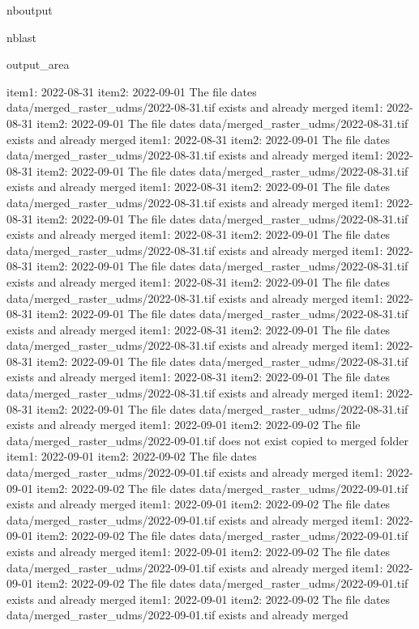 \documentclass[letterpaper,10pt]{sphinxmanual}
\begin{document}
\begin{sphinxuseclass}{nboutput}
\begin{sphinxuseclass}{nblast}
{\begin{sphinxuseclass}{output_area}
\begin{sphinxuseclass}{}
\begin{sphinxVerbatim}[commandchars=\\\{\}]
item1:  2022-08-31
item2:  2022-09-01
The file dates data/merged\_raster\_udms/2022-08-31.tif exists and already merged
item1:  2022-08-31
item2:  2022-09-01
The file dates data/merged\_raster\_udms/2022-08-31.tif exists and already merged
item1:  2022-08-31
item2:  2022-09-01
The file dates data/merged\_raster\_udms/2022-08-31.tif exists and already merged
item1:  2022-08-31
item2:  2022-09-01
The file dates data/merged\_raster\_udms/2022-08-31.tif exists and already merged
item1:  2022-08-31
item2:  2022-09-01
The file dates data/merged\_raster\_udms/2022-08-31.tif exists and already merged
item1:  2022-08-31
item2:  2022-09-01
The file dates data/merged\_raster\_udms/2022-08-31.tif exists and already merged
item1:  2022-08-31
item2:  2022-09-01
The file dates data/merged\_raster\_udms/2022-08-31.tif exists and already merged
item1:  2022-08-31
item2:  2022-09-01
The file dates data/merged\_raster\_udms/2022-08-31.tif exists and already merged
item1:  2022-08-31
item2:  2022-09-01
The file dates data/merged\_raster\_udms/2022-08-31.tif exists and already merged
item1:  2022-08-31
item2:  2022-09-01
The file dates data/merged\_raster\_udms/2022-08-31.tif exists and already merged
item1:  2022-08-31
item2:  2022-09-01
The file dates data/merged\_raster\_udms/2022-08-31.tif exists and already merged
item1:  2022-08-31
item2:  2022-09-01
The file dates data/merged\_raster\_udms/2022-08-31.tif exists and already merged
item1:  2022-08-31
item2:  2022-09-01
The file dates data/merged\_raster\_udms/2022-08-31.tif exists and already merged
item1:  2022-08-31
item2:  2022-09-01
The file dates data/merged\_raster\_udms/2022-08-31.tif exists and already merged
item1:  2022-09-01
item2:  2022-09-02
The file data/merged\_raster\_udms/2022-09-01.tif does not exist copied to merged folder
item1:  2022-09-01
item2:  2022-09-02
The file dates data/merged\_raster\_udms/2022-09-01.tif exists and already merged
item1:  2022-09-01
item2:  2022-09-02
The file dates data/merged\_raster\_udms/2022-09-01.tif exists and already merged
item1:  2022-09-01
item2:  2022-09-02
The file dates data/merged\_raster\_udms/2022-09-01.tif exists and already merged
item1:  2022-09-01
item2:  2022-09-02
The file dates data/merged\_raster\_udms/2022-09-01.tif exists and already merged
item1:  2022-09-01
item2:  2022-09-02
The file dates data/merged\_raster\_udms/2022-09-01.tif exists and already merged
item1:  2022-09-01
item2:  2022-09-02
The file dates data/merged\_raster\_udms/2022-09-01.tif exists and already merged
item1:  2022-09-01
item2:  2022-09-02
The file dates data/merged\_raster\_udms/2022-09-01.tif exists and already merged

\end{sphinxVerbatim}
\end{sphinxuseclass}
\end{sphinxuseclass}}
\end{sphinxuseclass}
\end{sphinxuseclass}
\end{document}
